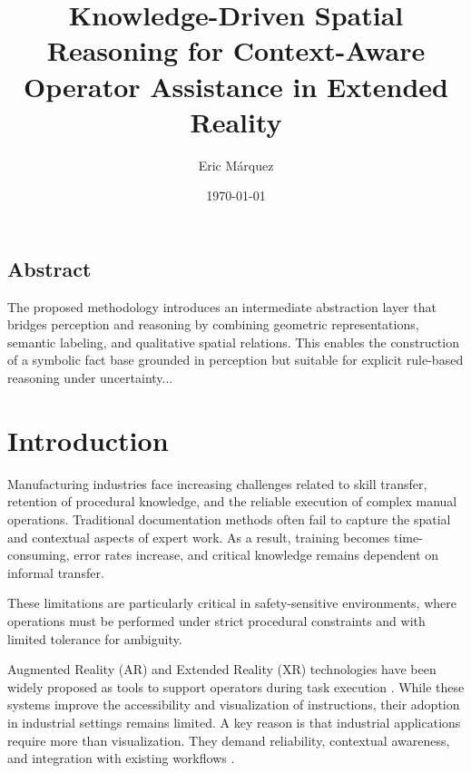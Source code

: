 \documentclass[11pt,titlepage,openright]{book}
\begin{document}
\frontmatter
\title{Knowledge-Driven Spatial Reasoning for Context-Aware Operator Assistance in Extended Reality}
\author{Eric Márquez}
\date{\today}

\maketitle

\vspace*{3cm}
\section*{Abstract}

The proposed methodology introduces an intermediate abstraction layer that bridges perception and reasoning by combining geometric representations, semantic labeling, and qualitative spatial relations. This enables the construction of a symbolic fact base grounded in perception but suitable for explicit rule-based reasoning under uncertainty...


\tableofcontents
\listoffigures
\listoftables

\mainmatter

\chapter{Introduction}

Manufacturing industries face increasing challenges related to skill transfer, retention of procedural knowledge, and the reliable execution of complex manual operations. Traditional documentation methods often fail to capture the spatial and contextual aspects of expert work. As a result, training becomes time-consuming, error rates increase, and critical knowledge remains dependent on informal transfer.

These limitations are particularly critical in safety-sensitive environments, where operations must be performed under strict procedural constraints and with limited tolerance for ambiguity.

Augmented Reality (AR) and Extended Reality (XR) technologies have been widely proposed as tools to support operators during task execution \citep{Mourtzis2020,Uva2018}. While these systems improve the accessibility and visualization of instructions, their adoption in industrial settings remains limited. A key reason is that industrial applications require more than visualization. They demand reliability, contextual awareness, and integration with existing workflows \citep{DavilaDelgado2020,Lorenz2018}.
\end{document}
